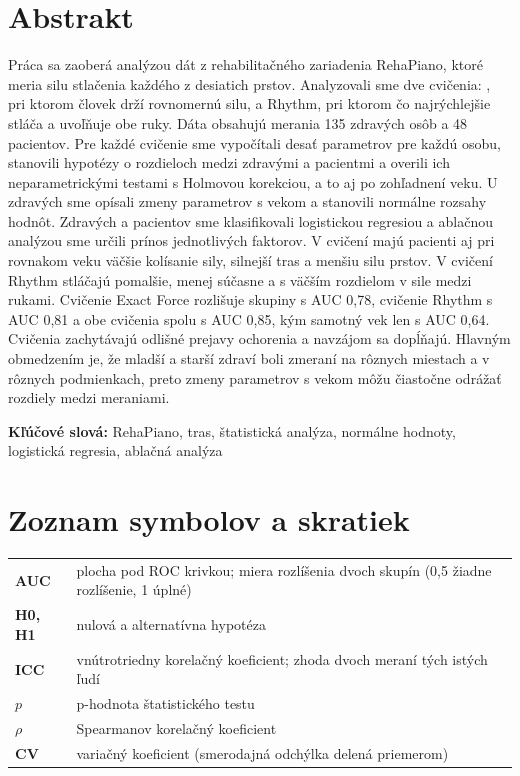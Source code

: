 \documentclass[12pt,a4paper]{article}
\begin{document}

\thispagestyle{plain}
\section*{Abstrakt}

Práca sa zaoberá analýzou dát z rehabilitačného zariadenia RehaPiano, ktoré meria silu stlačenia každého
z desiatich prstov. Analyzovali sme dve cvičenia: \ef{}, pri ktorom človek drží rovnomernú silu, a Rhythm,
pri ktorom čo najrýchlejšie stláča a uvoľňuje obe ruky. Dáta obsahujú merania 135 zdravých osôb a 48 pacientov.
Pre každé cvičenie
sme vypočítali desať parametrov pre každú osobu, stanovili hypotézy o rozdieloch medzi zdravými a pacientmi a overili ich
neparametrickými testami s Holmovou korekciou, a to aj po zohľadnení veku. U zdravých sme opísali zmeny parametrov s vekom a stanovili normálne rozsahy hodnôt. Zdravých a pacientov sme klasifikovali logistickou regresiou a ablačnou analýzou
sme určili prínos jednotlivých faktorov. V cvičení \ef{} majú pacienti aj pri rovnakom veku väčšie kolísanie sily, silnejší
tras a menšiu silu prstov. V cvičení Rhythm stláčajú pomalšie, menej súčasne a s väčším rozdielom v sile medzi rukami.
Cvičenie Exact Force rozlišuje skupiny s AUC 0,78, cvičenie Rhythm s AUC 0,81 a obe cvičenia spolu s AUC 0,85, kým samotný
vek len s AUC 0,64. Cvičenia zachytávajú odlišné prejavy ochorenia a navzájom sa dopĺňajú. Hlavným obmedzením je, že
mladší a starší zdraví boli zmeraní na rôznych miestach a v rôznych podmienkach, preto zmeny parametrov s vekom
môžu čiastočne odrážať rozdiely medzi meraniami.

\textbf{Kľúčové slová:} RehaPiano, tras, štatistická analýza, normálne hodnoty, logistická regresia, ablačná analýza

\clearpage
{\tableofcontents}
\clearpage
\listoffigures
\listoftables

\section*{Zoznam symbolov a skratiek}
\begin{tabularx}{\textwidth}{@{}>{\bfseries}p{2.6cm} L@{}}
AUC & plocha pod ROC krivkou; miera rozlíšenia dvoch skupín (0,5 žiadne rozlíšenie, 1 úplné) \\
H0, H1 & nulová a alternatívna hypotéza \\
ICC & vnútrotriedny korelačný koeficient; zhoda dvoch meraní tých istých ľudí \\
$p$ & p-hodnota štatistického testu \\
$\rho$ & Spearmanov korelačný koeficient \\
CV & variačný koeficient (smerodajná odchýlka delená priemerom) \\
\end{tabularx}
\end{document}
